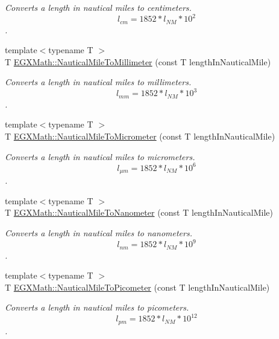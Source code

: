 \begin{DoxyCompactItemize}
\begin{DoxyCompactList}\small\item\em Converts a length in nautical miles to centimeters. \[ l_{cm}=1852 * l_{NM} * 10^{2} \]. \end{DoxyCompactList}\item 
{\footnotesize template$<$typename T $>$ }\\T \mbox{\hyperlink{group___e_g_x_math-_conversions-_length_conversions-_non-_s_i-_nautical_mile-_s_i_ga10840f2eeeb3fe428db89373cb306246}{E\+G\+X\+Math\+::\+Nautical\+Mile\+To\+Millimeter}} (const T length\+In\+Nautical\+Mile)
\begin{DoxyCompactList}\small\item\em Converts a length in nautical miles to millimeters. \[ l_{mm}=1852 * l_{NM} * 10^{3} \]. \end{DoxyCompactList}\item 
{\footnotesize template$<$typename T $>$ }\\T \mbox{\hyperlink{group___e_g_x_math-_conversions-_length_conversions-_non-_s_i-_nautical_mile-_s_i_ga8ce271a279676a3461dddc59c6a9720b}{E\+G\+X\+Math\+::\+Nautical\+Mile\+To\+Micrometer}} (const T length\+In\+Nautical\+Mile)
\begin{DoxyCompactList}\small\item\em Converts a length in nautical miles to micrometers. \[ l_{\mu m}=1852 * l_{NM} * 10^{6} \]. \end{DoxyCompactList}\item 
{\footnotesize template$<$typename T $>$ }\\T \mbox{\hyperlink{group___e_g_x_math-_conversions-_length_conversions-_non-_s_i-_nautical_mile-_s_i_ga914f8e21cf415b90729304b19eec1f05}{E\+G\+X\+Math\+::\+Nautical\+Mile\+To\+Nanometer}} (const T length\+In\+Nautical\+Mile)
\begin{DoxyCompactList}\small\item\em Converts a length in nautical miles to nanometers. \[ l_{nm}=1852 * l_{NM} * 10^{9} \]. \end{DoxyCompactList}\item 
{\footnotesize template$<$typename T $>$ }\\T \mbox{\hyperlink{group___e_g_x_math-_conversions-_length_conversions-_non-_s_i-_nautical_mile-_s_i_ga5ab6a92054685d45fb032111bcde94e0}{E\+G\+X\+Math\+::\+Nautical\+Mile\+To\+Picometer}} (const T length\+In\+Nautical\+Mile)
\begin{DoxyCompactList}\small\item\em Converts a length in nautical miles to picometers. \[ l_{pm}=1852 * l_{NM} * 10^{12} \]. \end{DoxyCompactList}\item 

\end{DoxyCompactItemize}
